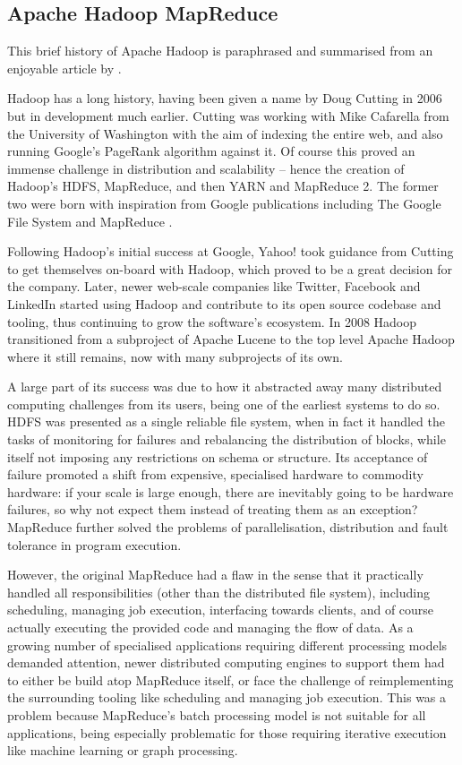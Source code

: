 \subsection{Apache Hadoop MapReduce}

  This brief history of Apache Hadoop is paraphrased and summarised from an enjoyable article by \citeauthor{BONACI:HADOOP_HISTORY:2015} \cite{BONACI:HADOOP_HISTORY:2015}.
  
  Hadoop has a long history, having been given a name by Doug Cutting in 2006 but in development much earlier. Cutting was working with Mike Cafarella from the University of Washington with the aim of indexing the entire web, and also running Google's PageRank algorithm against it. Of course this proved an immense challenge in distribution and scalability -- hence the creation of Hadoop's HDFS, MapReduce, and then YARN and MapReduce 2. The former two were born with inspiration from Google publications including The Google File System \cite{ghemawat2003google} and MapReduce \cite{DeanG:MAPREDUCE:OSDI2004}.
  
  Following Hadoop's initial success at Google, Yahoo! took guidance from Cutting to get themselves on-board with Hadoop, which proved to be a great decision for the company. Later, newer web-scale companies like Twitter, Facebook and LinkedIn started using Hadoop and contribute to its open source codebase and tooling, thus continuing to grow the software's ecosystem. In 2008 Hadoop transitioned from a subproject of Apache Lucene to the top level Apache Hadoop where it still remains, now with many subprojects of its own.

  A large part of its success was due to how it abstracted away many distributed computing challenges from its users, being one of the earliest systems to do so. HDFS was presented as a single reliable file system, when in fact it handled the tasks of monitoring for failures and rebalancing the distribution of blocks, while itself not imposing any restrictions on schema or structure. Its acceptance of failure promoted a shift from expensive, specialised hardware to commodity hardware: if your scale is large enough, there are inevitably going to be hardware failures, so why not expect them instead of treating them as an exception? MapReduce further solved the problems of parallelisation, distribution and fault tolerance in program execution. 

  However, the original MapReduce had a flaw in the sense that it practically handled all responsibilities (other than the distributed file system), including scheduling, managing job execution, interfacing towards clients, and of course actually executing the provided code and managing the flow of data. As a growing number of specialised applications requiring different processing models demanded attention, newer distributed computing engines to support them had to either be build atop MapReduce itself, or face the challenge of reimplementing the surrounding tooling like scheduling and managing job execution. This was a problem because MapReduce's batch processing model is not suitable for all applications, being especially problematic for those requiring iterative execution like machine learning or graph processing.

